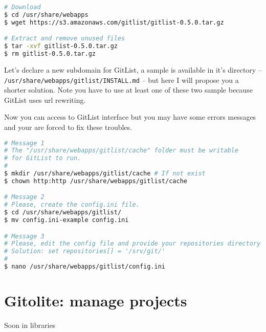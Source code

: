 \begin{lstlisting}[language=bash,caption=Download GitList]
# Download
$ cd /usr/share/webapps
$ wget https://s3.amazonaws.com/gitlist/gitlist-0.5.0.tar.gz

# Extract and remove unused files
$ tar -xvf gitlist-0.5.0.tar.gz
$ rm gitlist-0.5.0.tar.gz
\end{lstlisting}

Let's declare a new subdomain for GitList, a sample is available in it's directory 
-- \texttt{/usr/share/webapps/gitlist/INSTALL.md} -- but here I will propose you 
a shorter solution. Note you have to use at least one of these two sample because 
GitList uses url rewriting.

\lstset{language=bash,caption=GitList configuration for nginx}


Now you can access to GitList interface but you may have some errors messages and 
your are forced to fix these troubles.

\begin{lstlisting}[language=bash,caption=Fix GitList troubles]
# Message 1
# The "/usr/share/webapps/gitlist/cache" folder must be writable 
# for GitList to run.
#
$ mkdir /usr/share/webapps/gitlist/cache # If not exist
$ chown http:http /usr/share/webapps/gitlist/cache

# Message 2
# Please, create the config.ini file.
$ cd /usr/share/webapps/gitlist/
$ mv config.ini-example config.ini

# Message 3
# Please, edit the config file and provide your repositories directory
# Solution: set repositories[] = '/srv/git/'
#
$ nano /usr/share/webapps/gitlist/config.ini
\end{lstlisting}

\section{Gitolite: manage projects}
Soon in libraries

%
